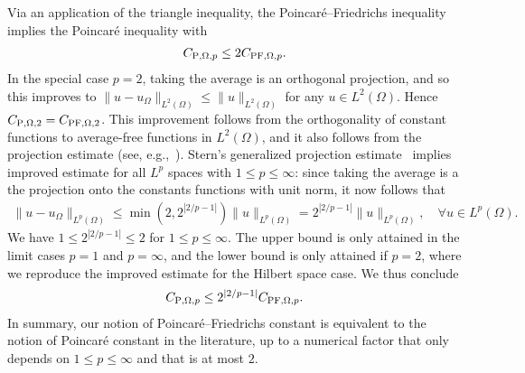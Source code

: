 \documentclass[12pt,a4paper]{article}
\begin{document}
Via an application of the triangle inequality, 
the Poincar\'e--Friedrichs inequality implies the Poincar\'e inequality with 
\begin{align*}
    C_{{\rm P},\Omega,p} \leq 2 C_{{\rm PF},\Omega,p}.
\end{align*}
In the special case $p=2$, taking the average is an orthogonal projection, and so this improves to $\| u - u_\Omega \|_{L^{2}(\Omega)} \leq \| u \|_{L^{2}(\Omega)}$ for any $u \in L^{2}(\Omega)$. Hence $C_{{\rm P},\Omega,2} = C_{{\rm PF},\Omega,2}$. 
This improvement follows from the orthogonality of constant functions to average-free functions in $L^2(\Omega)$,
and it also follows from the projection estimate (see, e.g.,~\cite{xu2003some}).
Stern's generalized projection estimate~\cite[Theorem~4.1,Remark~5.1]{stern2015banach} implies improved estimate for all $L^p$ spaces with $1 \leq p \leq \infty$:
since taking the average is a the projection onto the constants functions with unit norm, it now follows that 
\begin{align*}
    \| u - u_\Omega \|_{L^{p}(\Omega)}
    \leq 
    \min\left( 2, 2^{|2/p-1|} \right)
    \| u \|_{L^{p}(\Omega)}
    = 
    2^{|2/p-1|} 
    \| u \|_{L^{p}(\Omega)}
    ,
    \quad 
    \forall 
    u \in L^p(\Omega)
    .
\end{align*}
We have $1 \leq 2^{|2/p-1|} \leq 2$ for $1 \leq p \leq \infty$.
The upper bound is only attained in the limit cases $p = 1$ and $p = \infty$, and the lower bound is only attained if $p = 2$, where we reproduce the improved estimate for the Hilbert space case.
We thus conclude 
\begin{align}\label{math:p_vs_pf}
    C_{{\rm P},\Omega,p} \leq 2^{|2/p-1|} C_{{\rm PF},\Omega,p}.
\end{align}
In summary, our notion of Poincar\'e--Friedrichs constant is equivalent to the notion of Poincar\'e constant in the literature, up to a numerical factor that only depends on $1 \leq p \leq \infty$ and that is at most $2$.
\\
\end{document}
